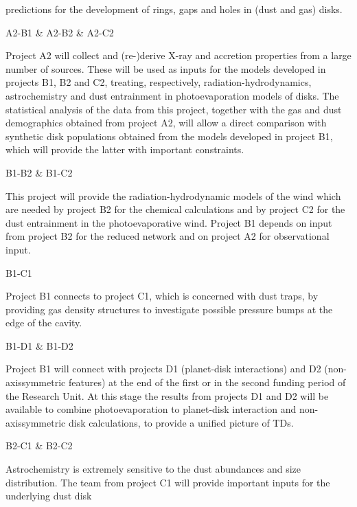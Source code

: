 \documentclass[10pt,fleqn,twoside,a4paper]{article}
\begin{document}
predictions for the development of rings, gaps and holes in (dust and
gas) disks. \\
\begin{Emphasize}  A2-B1 \& A2-B2 \& A2-C2 \end{Emphasize} Project A2 will collect
and (re-)derive X-ray and accretion properties 
from a large number of sources. These will be used as inputs for the models
developed in projects B1, B2 and C2, treating, respectively,
radiation-hydrodynamics, astrochemistry and dust entrainment in
photoevaporation models of disks. The statistical analysis of the
data from this project, together with the gas and dust demographics
obtained from project A2, will allow a direct comparison with synthetic disk
populations obtained from the models developed in project B1, which
will provide the latter with important constraints. \\
\begin{Emphasize}  B1-B2 \& B1-C2 \end{Emphasize}  
 This project will provide the radiation-hydrodynamic models of the
wind which are needed by project B2 for the
chemical calculations and by project C2 for the dust
entrainment in the photoevaporative wind. Project B1 depends on input
from project B2 for the 
reduced network and on project A2 for observational input. \\
\begin{Emphasize}  B1-C1  \end{Emphasize}  Project B1 connects to project C1, which is concerned with
dust traps, by providing gas density structures to investigate
possible pressure bumps at the edge of the cavity. \\
\begin{Emphasize}  B1-D1 \& B1-D2 \end{Emphasize} 
Project B1 will connect with projects D1 (planet-disk
interactions) and D2 (non-axissymmetric features) at the end of
the first or in the second funding period of the Research Unit. At
this stage the results from projects D1 and D2 will be available to
combine photoevaporation to planet-disk interaction and
non-axissymmetric disk calculations, to provide a unified picture
of TDs. \\
\begin{Emphasize} B2-C1 \& B2-C2  \end{Emphasize}
Astrochemistry is extremely sensitive to the dust abundances and size
distribution. The team from 
project C1 will provide important inputs for the underlying dust disk 
\end{document}
